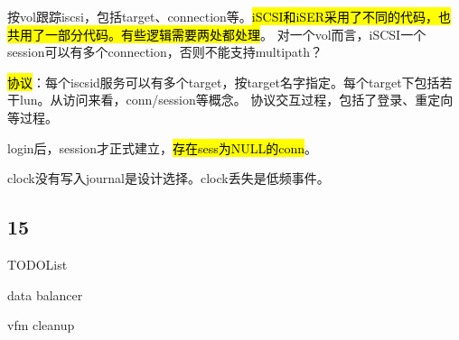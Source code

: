 按vol跟踪iscsi，包括target、connection等。\hl{iSCSI和iSER采用了不同的代码，也共用了一部分代码。有些逻辑需要两处都处理}。
对一个vol而言，iSCSI一个session可以有多个connection，否则不能支持multipath？

\hl{协议}：每个iscsid服务可以有多个target，按target名字指定。每个target下包括若干lun。从访问来看，conn/session等概念。
协议交互过程，包括了登录、重定向等过程。

login后，session才正式建立，\hl{存在sess为NULL的conn}。

clock没有写入journal是设计选择。clock丢失是低频事件。

\subsection{15}

TODOList
\begin{enumbox}
\item data balancer
\item vfm cleanup
\end{enumbox}
